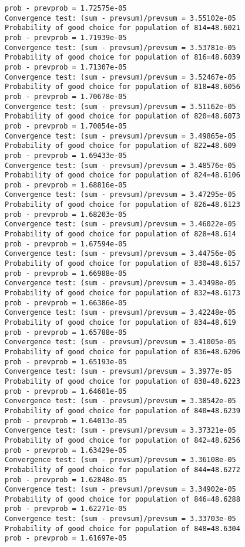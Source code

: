 \documentclass[11pt,onecolumn]{article}
\begin{document}
\begin{verbatim}
prob - prevprob = 1.72575e-05
Convergence test: (sum - prevsum)/prevsum = 3.55102e-05
Probability of good choice for population of 814=48.6021
prob - prevprob = 1.71939e-05
Convergence test: (sum - prevsum)/prevsum = 3.53781e-05
Probability of good choice for population of 816=48.6039
prob - prevprob = 1.71307e-05
Convergence test: (sum - prevsum)/prevsum = 3.52467e-05
Probability of good choice for population of 818=48.6056
prob - prevprob = 1.70678e-05
Convergence test: (sum - prevsum)/prevsum = 3.51162e-05
Probability of good choice for population of 820=48.6073
prob - prevprob = 1.70054e-05
Convergence test: (sum - prevsum)/prevsum = 3.49865e-05
Probability of good choice for population of 822=48.609
prob - prevprob = 1.69433e-05
Convergence test: (sum - prevsum)/prevsum = 3.48576e-05
Probability of good choice for population of 824=48.6106
prob - prevprob = 1.68816e-05
Convergence test: (sum - prevsum)/prevsum = 3.47295e-05
Probability of good choice for population of 826=48.6123
prob - prevprob = 1.68203e-05
Convergence test: (sum - prevsum)/prevsum = 3.46022e-05
Probability of good choice for population of 828=48.614
prob - prevprob = 1.67594e-05
Convergence test: (sum - prevsum)/prevsum = 3.44756e-05
Probability of good choice for population of 830=48.6157
prob - prevprob = 1.66988e-05
Convergence test: (sum - prevsum)/prevsum = 3.43498e-05
Probability of good choice for population of 832=48.6173
prob - prevprob = 1.66386e-05
Convergence test: (sum - prevsum)/prevsum = 3.42248e-05
Probability of good choice for population of 834=48.619
prob - prevprob = 1.65788e-05
Convergence test: (sum - prevsum)/prevsum = 3.41005e-05
Probability of good choice for population of 836=48.6206
prob - prevprob = 1.65193e-05
Convergence test: (sum - prevsum)/prevsum = 3.3977e-05
Probability of good choice for population of 838=48.6223
prob - prevprob = 1.64601e-05
Convergence test: (sum - prevsum)/prevsum = 3.38542e-05
Probability of good choice for population of 840=48.6239
prob - prevprob = 1.64013e-05
Convergence test: (sum - prevsum)/prevsum = 3.37321e-05
Probability of good choice for population of 842=48.6256
prob - prevprob = 1.63429e-05
Convergence test: (sum - prevsum)/prevsum = 3.36108e-05
Probability of good choice for population of 844=48.6272
prob - prevprob = 1.62848e-05
Convergence test: (sum - prevsum)/prevsum = 3.34902e-05
Probability of good choice for population of 846=48.6288
prob - prevprob = 1.62271e-05
Convergence test: (sum - prevsum)/prevsum = 3.33703e-05
Probability of good choice for population of 848=48.6304
prob - prevprob = 1.61697e-05

\end{verbatim}
\end{document}
